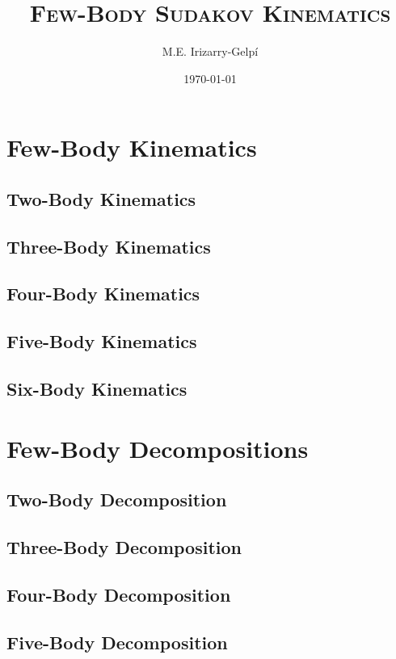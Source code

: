 \documentclass[letterpaper, 12pt]{report}
\begin{document}
\title{\Huge\textsc{Few-Body Sudakov Kinematics}}
\author{M.E. Irizarry-Gelp\'{i}}
\date{\today}

\maketitle
\tableofcontents




\part{Few-Body Kinematics}

\chapter{Two-Body Kinematics}
\chapter{Three-Body Kinematics}
\chapter{Four-Body Kinematics}
\chapter{Five-Body Kinematics}
\chapter{Six-Body Kinematics}

\part{Few-Body Decompositions}

\chapter{Two-Body Decomposition}
\chapter{Three-Body Decomposition}
\chapter{Four-Body Decomposition}
\chapter{Five-Body Decomposition}
\end{document}
